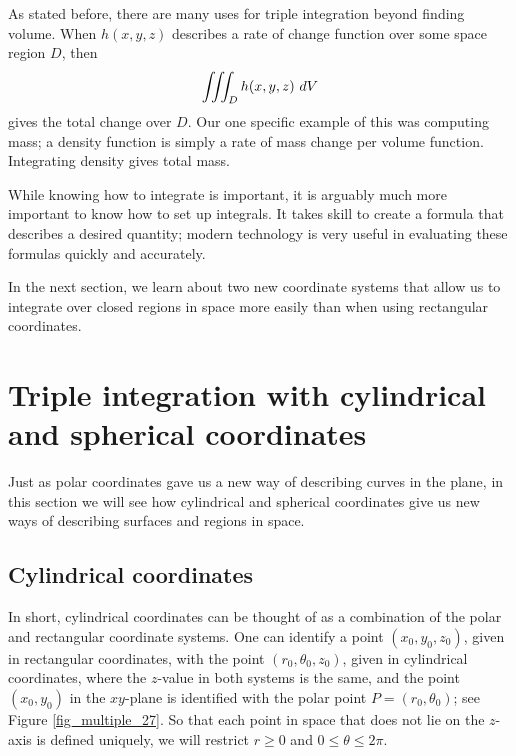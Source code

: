 As stated before, there are many uses for triple integration beyond finding volume. When $h(x,y,z)$ describes a rate of change function over some space region $D$, then $$\displaystyle \iiint_D h(x,y,z)\ dV$$ gives the total change over $D$. Our one specific example of this was computing mass; a density function is simply a rate of mass change per volume function. Integrating density gives total mass.

While knowing how to integrate  is important, it is arguably much more important to know how to set up integrals. It takes skill to create a formula that describes a desired quantity; modern technology is very useful in evaluating these formulas quickly and accurately.

In the next section, we learn about two new coordinate systems that allow us to integrate over closed regions in space more easily than when using rectangular coordinates.


\section{Triple integration with cylindrical and spherical coordinates}\label{sec:cylindrical_spherical}

	\checkoddpage
{}

Just as polar coordinates gave us a new way of describing curves in the plane, in this section we will see how cylindrical and spherical coordinates give us new ways of describing surfaces and regions in space.

\pagebreak
\subsection{Cylindrical coordinates}

In short, cylindrical coordinates can be thought of as a combination of the polar and rectangular coordinate systems. One can identify a point $(x_0,y_0,z_0)$, given in rectangular coordinates, with the point $(r_0,\theta_0,z_0)$, given in cylindrical coordinates, where the $z$-value in both systems is the same, and the point $(x_0,y_0)$ in the $xy$-plane is identified with the polar point $P=(r_0,\theta_0)$; see Figure \ref{fig_multiple_27}. So that each point in space that does not lie on the $z$-axis is defined uniquely, we will restrict $r\geq 0$ and $0\leq \theta\leq 2\pi$.



